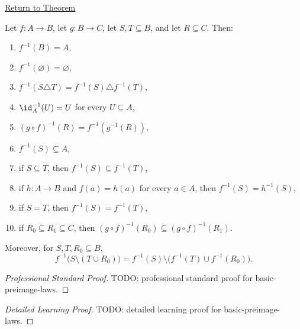 \newpage
{}
\label{prf:basic-preimage-laws}

\begin{remark*}[Return]
\hyperref[thm:basic-preimage-laws]{Return to Theorem}
\end{remark*}

\begin{theorem*}
Let $f:A\to B$, let $g:B\to C$, let $S,T\subseteq B$, and let $R\subseteq C$.
Then:
\begin{enumerate}[label=(\roman*)]
\item $f^{-1}(B)=A$,
\item $f^{-1}(\varnothing)=\varnothing$,
\item $f^{-1}(S\triangle T)=f^{-1}(S)\triangle f^{-1}(T)$,
\item $\id_A^{-1}(U)=U$ for every $U\subseteq A$,
\item $(g\circ f)^{-1}(R)=f^{-1}(g^{-1}(R))$,
\item $f^{-1}(S)\subseteq A$,
\item if $S\subseteq T$, then $f^{-1}(S)\subseteq f^{-1}(T)$,
\item if $h:A\to B$ and $f(a)=h(a)$ for every $a\in A$, then
      $f^{-1}(S)=h^{-1}(S)$,
\item if $S=T$, then $f^{-1}(S)=f^{-1}(T)$,
\item if $R_0\subseteq R_1\subseteq C$, then
      $(g\circ f)^{-1}(R_0)\subseteq (g\circ f)^{-1}(R_1)$.
\end{enumerate}
Moreover, for $S,T,R_0\subseteq B$,
\[
f^{-1}\!\bigl(S\setminus (T\cup R_0)\bigr)
=
f^{-1}(S)\setminus \bigl(f^{-1}(T)\cup f^{-1}(R_0)\bigr).
\]
\end{theorem*}

\begin{proof}[Professional Standard Proof]
\LRAProofBodyStart
TODO: professional standard proof for basic-preimage-laws.
\end{proof}

\begin{proof}[Detailed Learning Proof]
\LRAProofBodyStart
TODO: detailed learning proof for basic-preimage-laws.
\end{proof}

\begin{remark*}
\end{remark*}

